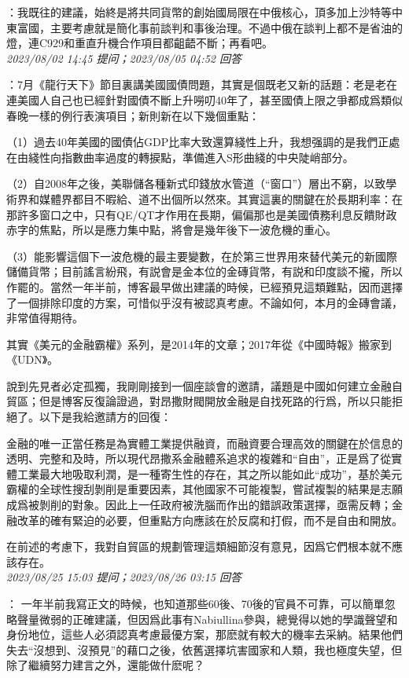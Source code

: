 \documentclass[twocolumn]{ctexart}
\begin{document}
：我既往的建議，始終是將共同貨幣的創始國局限在中俄核心，頂多加上沙特等中東富國，主要考慮就是簡化事前談判和事後治理。不過中俄在談判上都不是省油的燈，連C929和重直升機合作項目都齟齬不斷；再看吧。
\\

\textit{\hfill\noindent\small 2023/08/02 14:45 提问；2023/08/05 04:52 回答}

：7月《龍行天下》節目裏講美國國債問題，其實是個既老又新的話題：老是老在連美國人自己也已經針對國債不斷上升嘮叨40年了，甚至國債上限之爭都成爲類似春晚一樣的例行表演項目；新則新在以下幾個重點：

（1）過去40年美國的國債佔GDP比率大致還算綫性上升，我想强調的是我們正處在由綫性向指數曲率過度的轉捩點，準備進入S形曲綫的中央陡峭部分。

（2）自2008年之後，美聯儲各種新式印錢放水管道（“窗口”）層出不窮，以致學術界和媒體界都目不暇給、道不出個所以然來。其實這裏的關鍵在於長期利率：在那許多窗口之中，只有QE/QT才作用在長期，偏偏那也是美國債務利息反饋財政赤字的焦點，所以是應力集中點，將會是幾年後下一波危機的重心。

（3）能影響這個下一波危機的最主要變數，在於第三世界用來替代美元的新國際儲備貨幣；目前謠言紛飛，有説會是金本位的金磚貨幣，有説和印度談不攏，所以作罷的。當然一年半前，博客最早做出建議的時候，已經預見這類難點，因而選擇了一個排除印度的方案，可惜似乎沒有被認真考慮。不論如何，本月的金磚會議，非常值得期待。


其實《美元的金融霸權》系列，是2014年的文章；2017年從《中國時報》搬家到《UDN》。

說到先見者必定孤獨，我剛剛接到一個座談會的邀請，議題是中國如何建立金融自貿區；但是博客反復論證過，對昂撒財閥開放金融是自找死路的行爲，所以只能拒絕了。以下是我給邀請方的回復：

金融的唯一正當任務是為實體工業提供融資，而融資要合理高效的關鍵在於信息的透明、完整和及時，所以現代昂撒系金融體系追求的複雜和“自由”，正是爲了從實體工業最大地吸取利潤，是一種寄生性的存在，其之所以能如此“成功”，基於美元霸權的全球性搜刮剝削是重要因素，其他國家不可能複製，嘗試複製的結果是志願成爲被剝削的對象。因此上一任政府被洗腦而作出的錯誤政策選擇，亟需反轉；金融改革的確有緊迫的必要，但重點方向應該在於反腐和打假，而不是自由和開放。

在前述的考慮下，我對自貿區的規劃管理這類細節沒有意見，因爲它們根本就不應該存在。
\\

\textit{\hfill\noindent\small 2023/08/25 15:03 提问；2023/08/26 03:15 回答}

：
一年半前我寫正文的時候，也知道那些60後、70後的官員不可靠，可以簡單忽略聲量微弱的正確建議，但因爲此事有Nabiullina參與，總覺得以她的學識聲望和身份地位，這些人必須認真考慮最優方案，那麽就有較大的機率去采納。結果他們失去“沒想到、沒預見”的藉口之後，依舊選擇坑害國家和人類，我也極度失望，但除了繼續努力建言之外，還能做什麽呢？
\\
\end{document}
